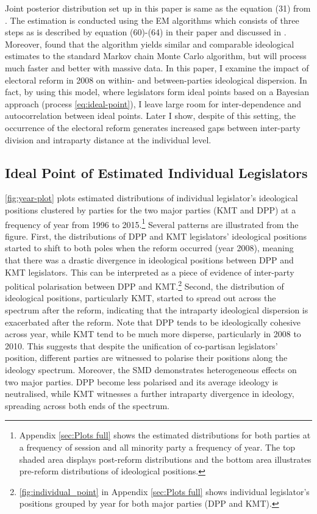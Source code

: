 Joint posterior distribution set up in this paper  is same as the equation (31) from \citet{Imai2016}. The estimation is conducted using the EM algorithms which consists of three steps as is described by equation (60)-(64) in their paper and discussed in \citet{Armstrong2020}. Moreover, \citet{Imai2016} found that the algorithm yields similar and comparable ideological estimates to the standard Markov chain Monte Carlo algorithm, but will process much faster and better with massive data. In this paper, I examine the impact of electoral reform in 2008 on within- and between-parties ideological dispersion. In fact, by using this model, where legislators form ideal points based on a Bayesian approach (process \autoref{eq:ideal-point}), I leave large room for inter-dependence and autocorrelation between ideal points. Later I show, despite of this setting, the occurrence of the electoral reform generates increased gaps between inter-party division and intraparty distance at the individual level. 

\subsection*{Ideal Point of Estimated Individual Legislators}

\autoref{fig:year-plot} plots estimated distributions of individual legislator's ideological positions clustered by parties for the two major parties (KMT and DPP) at a frequency of year from 1996 to 2015.\footnote{Appendix \ref{sec:Plots full} shows the estimated distributions for both parties at a frequency of session and all minority party a frequency of year. The top shaded area displays post-reform distributions and the bottom area illustrates pre-reform distributions of ideological positions.} Several patterns are illustrated from the figure. First, the distributions of DPP and KMT legislators' ideological positions started to shift to both poles when the reform occurred (year 2008), meaning that there was a drastic divergence in ideological positions between DPP and KMT legislators. This can be interpreted as a piece of evidence of inter-party political polarisation between DPP and KMT.\footnote{\autoref{fig:individual_point} in Appendix \autoref{sec:Plots full} shows individual legislator's positions grouped by year for both major parties (DPP and KMT).} Second, the distribution of ideological positions, particularly KMT, started to spread out across the spectrum after the reform, indicating that the intraparty ideological dispersion is exacerbated after the reform. Note that DPP tends to be ideologically cohesive across year, while KMT tend to be much more disperse, particularly in 2008 to 2010. This suggests that despite the unification of co-partisan legislators' position, different parties are witnessed to polarise their positions along the ideology spectrum. Moreover, the SMD demonstrates heterogeneous effects on two major parties. DPP become less polarised and its average ideology is neutralised, while KMT witnesses a further intraparty divergence in ideology, spreading across both ends of the spectrum.

